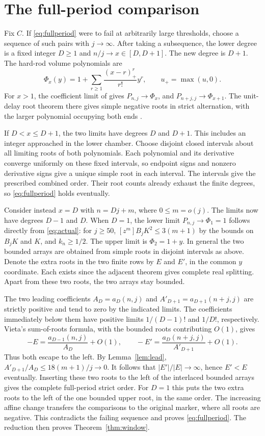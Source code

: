 \documentclass[10pt]{article}
\begin{document}
\section{The full-period comparison}
Fix $C$. If \eqref{eq:fullperiod} were to fail at arbitrarily large thresholds, choose a sequence of such pairs with $j\to\infty$. After taking a subsequence, the lower degree is a fixed integer $D\ge1$ and $n/j\to x\in[D,D+1]$. The new degree is $D+1$. The hard-rod volume polynomials are
\[
 \Phi_x(y)=1+\sum_{r\ge1}\frac{(x-r)_+^r}{r!}y^r,\qquad u_+=\max(u,0).
\]
For $x>1$, the coefficient limit of \cite[Lemma~3]{adjacent} gives $P_{n,j}\to\Phi_x$, and $P_{n+j,j}\to\Phi_{x+1}$. The unit-delay root theorem there gives simple negative roots in strict alternation, with the larger polynomial occupying both ends \cite[Lemma~5]{adjacent}.

If $D<x\le D+1$, the two limits have degrees $D$ and $D+1$. This includes an integer approached in the lower chamber. Choose disjoint closed intervals about all limiting roots of both polynomials. Each polynomial and its derivative converge uniformly on these fixed intervals, so endpoint signs and nonzero derivative signs give a unique simple root in each interval. The intervals give the prescribed combined order. Their root counts already exhaust the finite degrees, so \eqref{eq:fullperiod} holds eventually.

Consider instead $x=D$ with $n=Dj+m$, where $0\le m=o(j)$. The limits now have degrees $D-1$ and $D$. When $D=1$, the lower limit $P_{n,j}\to\Phi_1=1$ follows directly from \eqref{eq:actual}: for $j\ge50$, $[z^m]B_jK^2\le3(m+1)$ by the bounds on $B_jK$ and $K$, and $k_n\ge1/2$. The upper limit is $\Phi_2=1+y$. In general the two bounded arrays are obtained from simple roots in disjoint intervals as above. Denote the extra roots in the two finite rows by $E$ and $E'$, in the common $y$ coordinate. Each exists since the adjacent theorem gives complete real splitting. Apart from these two roots, the two arrays stay bounded.

The two leading coefficients $A_D=a_D(n,j)$ and $A'_{D+1}=a_{D+1}(n+j,j)$ are strictly positive and tend to zero by the indicated limits. The coefficients immediately below them have positive limits $1/(D-1)!$ and $1/D!$, respectively. Vieta's sum-of-roots formula, with the bounded roots contributing $O(1)$, gives
\[
 -E=\frac{a_{D-1}(n,j)}{A_D}+O(1),\qquad
 -E'=\frac{a_D(n+j,j)}{A'_{D+1}}+O(1).
\]
Thus both escape to the left. By Lemma~\ref{lem:lead}, $A'_{D+1}/A_D\le18(m+1)/j\to0$. It follows that $|E'|/|E|\to\infty$, hence $E'<E$ eventually. Inserting these two roots to the left of the interlaced bounded arrays gives the complete full-period strict order. For $D=1$ this puts the two extra roots to the left of the one bounded upper root, in the same order. The increasing affine change transfers the comparisons to the original marker, where all roots are negative. This contradicts the failing sequence and proves \eqref{eq:fullperiod}. The reduction then proves Theorem~\ref{thm:window}.
\end{document}
